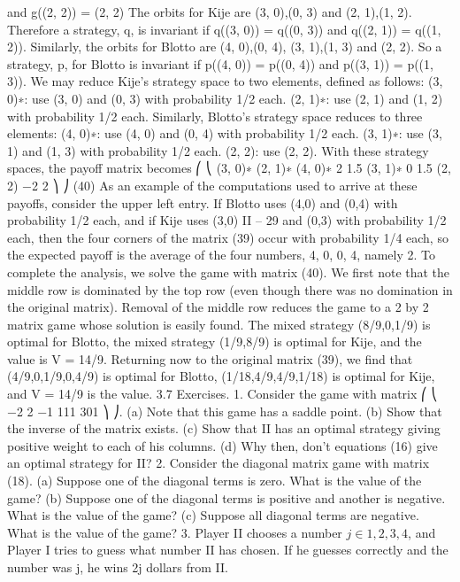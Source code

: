 and g((2, 2)) = (2, 2)
The orbits for Kije are {(3, 0),(0, 3)} and {(2, 1),(1, 2)}. Therefore a strategy, q, is
invariant if q((3, 0)) = q((0, 3)) and q((2, 1)) = q((1, 2)). Similarly, the orbits for Blotto
are {(4, 0),(0, 4)}, {(3, 1),(1, 3)} and {(2, 2)}. So a strategy, p, for Blotto is invariant if
p((4, 0)) = p((0, 4)) and p((3, 1)) = p((1, 3)).
We may reduce Kije’s strategy space to two elements, defined as follows:
(3, 0)∗: use (3, 0) and (0, 3) with probability 1/2 each.
(2, 1)∗: use (2, 1) and (1, 2) with probability 1/2 each.
Similarly, Blotto’s strategy space reduces to three elements:
(4, 0)∗: use (4, 0) and (0, 4) with probability 1/2 each.
(3, 1)∗: use (3, 1) and (1, 3) with probability 1/2 each.
(2, 2): use (2, 2).
With these strategy spaces, the payoff matrix becomes
⎛
⎝
(3, 0)∗ (2, 1)∗
(4, 0)∗ 2 1.5
(3, 1)∗ 0 1.5
(2, 2) −2 2
⎞
⎠ (40)
As an example of the computations used to arrive at these payoffs, consider the upper
left entry. If Blotto uses (4,0) and (0,4) with probability 1/2 each, and if Kije uses (3,0)
II – 29
and (0,3) with probability 1/2 each, then the four corners of the matrix (39) occur with
probability 1/4 each, so the expected payoff is the average of the four numbers, 4, 0, 0, 4,
namely 2.
To complete the analysis, we solve the game with matrix (40). We first note that
the middle row is dominated by the top row (even though there was no domination in the
original matrix). Removal of the middle row reduces the game to a 2 by 2 matrix game
whose solution is easily found. The mixed strategy (8/9,0,1/9) is optimal for Blotto, the
mixed strategy (1/9,8/9) is optimal for Kije, and the value is V = 14/9.
Returning now to the original matrix (39), we find that (4/9,0,1/9,0,4/9) is optimal
for Blotto, (1/18,4/9,4/9,1/18) is optimal for Kije, and V = 14/9 is the value.
3.7 Exercises.
1. Consider the game with matrix
⎛
⎝
−2 2 −1
111
301
⎞
⎠.
(a) Note that this game has a saddle point.
(b) Show that the inverse of the matrix exists.
(c) Show that II has an optimal strategy giving positive weight to each of his columns.
(d) Why then, don’t equations (16) give an optimal strategy for II?
2. Consider the diagonal matrix game with matrix (18).
(a) Suppose one of the diagonal terms is zero. What is the value of the game?
(b) Suppose one of the diagonal terms is positive and another is negative. What is
the value of the game?
(c) Suppose all diagonal terms are negative. What is the value of the game?
3. Player II chooses a number $j \in {1, 2, 3, 4}$, and Player I tries to guess what number
II has chosen. If he guesses correctly and the number was j, he wins 2j dollars from II.
